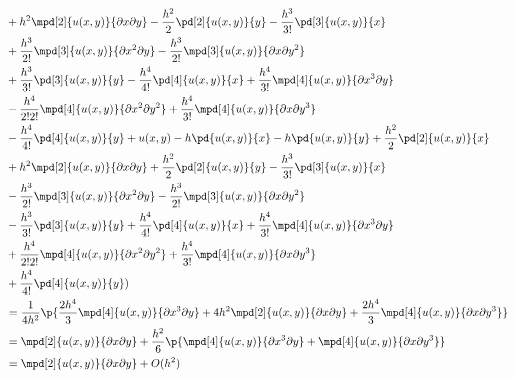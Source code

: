 \documentclass[11pt]{article}
\begin{document}
\begin{enumerate}
\begin{enumerate}
\begin{align*}
                        &+ h^2\mpd[2]{u(x,y)}{\partial x \partial y}
                        - \frac{h^2}{2}\pd[2]{u(x,y)}{y}
                        - \frac{h^3}{3!}\pd[3]{u(x,y)}{x} \\
                        &+ \frac{h^3}{2!} \mpd[3]{u(x,y)}{\partial x^2 \partial y}
                        - \frac{h^3}{2!} \mpd[3]{u(x,y)}{\partial x \partial y^2} \\
                        &+ \frac{h^3}{3!} \pd[3]{u(x,y)}{y}
                        - \frac{h^4}{4!} \pd[4]{u(x,y)}{x}
                        + \frac{h^4}{3!} \mpd[4]{u(x,y)}{\partial x^3 \partial y} \\
                        &- \frac{h^4}{2! 2!} \mpd[4]{u(x,y)}{\partial x^2 \partial y^2}
                        + \frac{h^4}{3!} \mpd[4]{u(x,y)}{\partial x \partial y^3} \\
                        &- \frac{h^4}{4!} \pd[4]{u(x,y)}{y}
                        + u(x,y) - h\pd{u(x,y)}{x} - h\pd{u(x,y)}{y}
                        + \frac{h^2}{2} \pd[2]{u(x,y)}{x} \\
                        &+ h^2\mpd[2]{u(x,y)}{\partial x \partial y}
                        + \frac{h^2}{2}\pd[2]{u(x,y)}{y}
                        - \frac{h^3}{3!}\pd[3]{u(x,y)}{x} \\
                        &- \frac{h^3}{2!} \mpd[3]{u(x,y)}{\partial x^2 \partial y}
                        - \frac{h^3}{2!} \mpd[3]{u(x,y)}{\partial x \partial y^2} \\
                        &- \frac{h^3}{3!} \pd[3]{u(x,y)}{y}
                        + \frac{h^4}{4!} \pd[4]{u(x,y)}{x}
                        + \frac{h^4}{3!} \mpd[4]{u(x,y)}{\partial x^3 \partial y} \\
                        &+ \frac{h^4}{2! 2!} \mpd[4]{u(x,y)}{\partial x^2 \partial y^2}
                        + \frac{h^4}{3!} \mpd[4]{u(x,y)}{\partial x \partial y^3} \\
                        &+ \frac{h^4}{4!} \pd[4]{u(x,y)}{y}) \\
                    &= \frac{1}{4h^2} \p{\frac{2h^4}{3}
                        \mpd[4]{u(x,y)}{\partial x^3 \partial y} + 
                        4h^2 \mpd[2]{u(x,y)}{\partial x \partial y} + \frac{2h^4}{3}
                        \mpd[4]{u(x,y)}{\partial x \partial y^3}} \\
                    &= \mpd[2]{u(x,y)}{\partial x \partial y} + \frac{h^2}{6} 
                        \p{\mpd[4]{u(x,y)}{\partial x^3 \partial y} + 
                        \mpd[4]{u(x,y)}{\partial x \partial y^3}}\\
                    &= \mpd[2]{u(x,y)}{\partial x \partial y} + O(h^2)
                \end{align*}
        \end{enumerate}


\end{enumerate}
\end{document}
